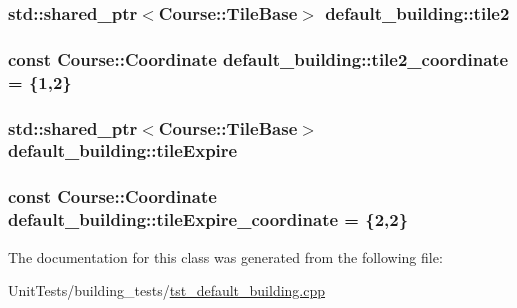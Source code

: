 \hypertarget{classdefault__building_adcb7e13de2a868910460f1ca658e44b0}{
\subsubsection[{tile2}]{\setlength{\rightskip}{0pt plus 5cm}std\-::shared\-\_\-ptr$<${\bf Course\-::\-Tile\-Base}$>$ default\-\_\-building\-::tile2\hspace{0.3cm}{\ttfamily [private]}}}\label{classdefault__building_adcb7e13de2a868910460f1ca658e44b0}
\hypertarget{classdefault__building_a6ba4a9f3044210aacfb738b593a585b7}{
\subsubsection[{tile2\-\_\-coordinate}]{\setlength{\rightskip}{0pt plus 5cm}const {\bf Course\-::\-Coordinate} default\-\_\-building\-::tile2\-\_\-coordinate = \{1,2\}\hspace{0.3cm}{\ttfamily [private]}}}\label{classdefault__building_a6ba4a9f3044210aacfb738b593a585b7}
\hypertarget{classdefault__building_a03bf0e5b69cdc4c06be2d1ef255f8550}{
\subsubsection[{tile\-Expire}]{\setlength{\rightskip}{0pt plus 5cm}std\-::shared\-\_\-ptr$<${\bf Course\-::\-Tile\-Base}$>$ default\-\_\-building\-::tile\-Expire\hspace{0.3cm}{\ttfamily [private]}}}\label{classdefault__building_a03bf0e5b69cdc4c06be2d1ef255f8550}
\hypertarget{classdefault__building_a5fadd5f10435b00e89e58ce9e32c57e5}{
\subsubsection[{tile\-Expire\-\_\-coordinate}]{\setlength{\rightskip}{0pt plus 5cm}const {\bf Course\-::\-Coordinate} default\-\_\-building\-::tile\-Expire\-\_\-coordinate = \{2,2\}\hspace{0.3cm}{\ttfamily [private]}}}\label{classdefault__building_a5fadd5f10435b00e89e58ce9e32c57e5}


The documentation for this class was generated from the following file\-:\begin{DoxyCompactItemize}
\item 
Unit\-Tests/building\-\_\-tests/\hyperlink{tst__default__building_8cpp}{tst\-\_\-default\-\_\-building.\-cpp}\end{DoxyCompactItemize}

